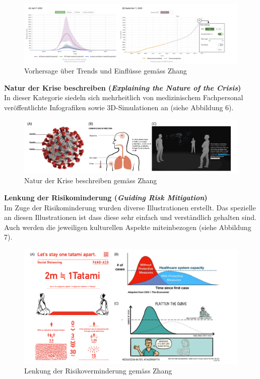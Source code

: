 \documentclass[12pt, oneside]{article}
\begin{document}
\begin{figure}[ht]
	\includegraphics[width=12cm]{images/forecasting_visualizations.png}
	\centering
	\caption{Vorhersage über Trends und Einflüsse gemäss Zhang ~\citep[S. 11]{YixuanZhang.}}
\end{figure}

\textbf{Natur der Krise beschreiben (\textit{Explaining the Nature of the Crisis})}\\
In dieser Kategorie siedeln sich mehrheitlich von medizinischem Fachpersonal veröffentlichte Infografiken sowie 3D-Simulationen an (siehe Abbildung 6).

\begin{figure}[ht]
	\includegraphics[width=12cm]{images/nature_of_crisis_visualizations.png}
	\centering
	\caption{Natur der Krise beschreiben gemäss Zhang ~\citep[S. 11]{YixuanZhang.}}
\end{figure}

\textbf{Lenkung der Risikominderung (\textit{Guiding Risk Mitigation})}\\
Im Zuge der Risikominderung wurden diverse Illustrationen erstellt. Das spezielle an diesen Illustrationen ist dass diese sehr einfach und verständlich gehalten sind. Auch werden die jeweiligen kulturellen Aspekte miteinbezogen (siehe Abbildung 7).


\begin{figure}[ht]
	\includegraphics[width=12cm]{images/risk_mitigation_visualizations.png}
	\centering
	\caption{Lenkung der Risikoverminderung gemäss Zhang ~\citep[S. 12]{YixuanZhang.}}
\end{figure}
\end{document}
